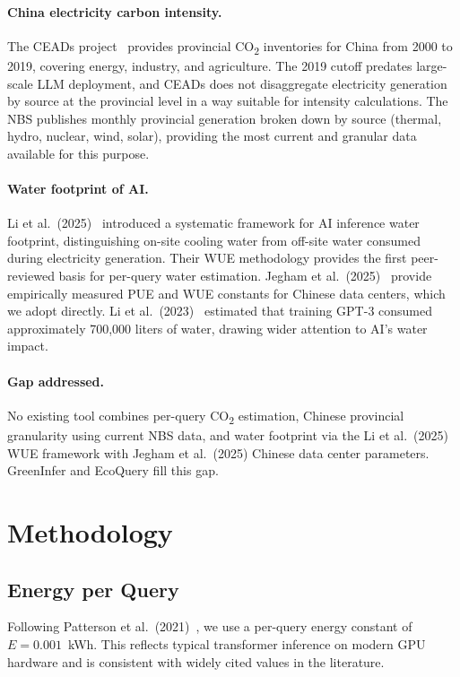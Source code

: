 \documentclass[11pt,a4paper]{article}
\begin{document}
\paragraph{China electricity carbon intensity.}
The CEADs project~\cite{ceads} provides provincial CO\textsubscript{2}
inventories for China from 2000 to 2019, covering energy, industry, and
agriculture. The 2019 cutoff predates large-scale LLM deployment, and
CEADs does not disaggregate electricity generation by source at the
provincial level in a way suitable for intensity calculations. The NBS
publishes monthly provincial generation broken down by source (thermal,
hydro, nuclear, wind, solar), providing the most current and granular data
available for this purpose.

\paragraph{Water footprint of AI.}
Li et al.\ (2025)~\cite{li2025} introduced a systematic framework for
AI inference water footprint, distinguishing on-site cooling water from
off-site water consumed during electricity generation. Their WUE
methodology provides the first peer-reviewed basis for per-query water
estimation. Jegham et al.\ (2025)~\cite{jegham2025} provide empirically
measured PUE and WUE constants for Chinese data centers, which we adopt
directly. Li et al.\ (2023)~\cite{li2023} estimated that training GPT-3
consumed approximately 700,000 liters of water, drawing wider attention to
AI's water impact.

\paragraph{Gap addressed.}
No existing tool combines per-query CO\textsubscript{2} estimation,
Chinese provincial granularity using current NBS data, and water footprint
via the Li et al.\ (2025) WUE framework with Jegham et al.\ (2025) Chinese
data center parameters. GreenInfer and EcoQuery fill this gap.

\section{Methodology}

\subsection{Energy per Query}

Following Patterson et al.\ (2021)~\cite{patterson2021}, we use a
per-query energy constant of $E = 0.001$~kWh. This reflects typical
transformer inference on modern GPU hardware and is consistent with widely
cited values in the literature.
\end{document}
